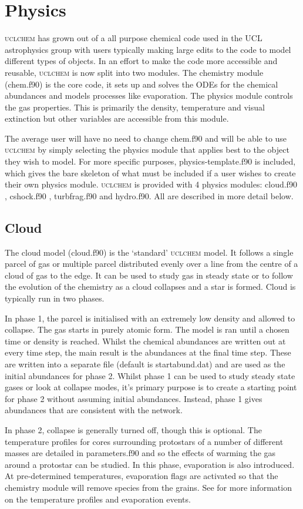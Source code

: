 \documentclass{llncs}
\begin{document}
\section{Physics}
\label{sec:physicsmods}
\textsc{uclchem} has grown out of a all purpose chemical code used in the UCL astrophysics group with users typically making large edits to the code to model different types of objects. In an effort to make the code more accessible and reusable, \textsc{uclchem} is now split into two modules. The chemistry module (chem.f90) is the core code, it sets up and solves the ODEs for the chemical abundances and models processes like evaporation. The physics module controls the gas properties. This is primarily the density, temperature and visual extinction but other variables are accessible from this module. \par
The average user will have no need to change chem.f90 and will be able to use \textsc{uclchem} by simply selecting the physics module that applies best to the object they wish to model. For more specific purposes, physics-template.f90 is included, which gives the bare skeleton of what must be included if a user wishes to create their own physics module. \textsc{uclchem} is provided with 4 physics modules: cloud.f90 \citep{viti2004}, cshock.f90 \citep{jimenez2008}, turbfrag.f90 \citep{Holdship2015} and hydro.f90. All are described in more detail below.
%
\subsection{Cloud}
The cloud model (cloud.f90) is the `standard' \textsc{uclchem} model. It follows a single parcel of gas or multiple parcel distributed evenly over a line from the centre of a cloud of gas to the edge. It can be used to study gas in steady state or to follow the evolution of the chemistry as a cloud collapses and a star is formed. Cloud is typically run in two phases. \par
In phase 1, the parcel is initialised with an extremely low density and allowed to collapse. The gas starts in purely atomic form. The model is ran until a chosen time or density is reached. Whilst the chemical abundances are written out at every time step, the main result is the abundances at the final time step. These are written into a separate file (default is startabund.dat) and are used as the initial abundances for phase 2. Whilst phase 1 can be used to study steady state gases or look at collapse modes, it's primary purpose is to create a starting point for phase 2 without assuming initial abundances. Instead, phase 1 gives abundances that are consistent with the network.\par
In phase 2, collapse is generally turned off, though this is optional. The temperature profiles for cores surrounding protostars of a number of different masses are detailed in parameters.f90 and so the effects of warming the gas around a protostar can be studied. In this phase, evaporation is also introduced. At pre-determined temperatures, evaporation flags are activated so that the chemistry module will remove species from the grains. See \citet{viti2004} for more information on the temperature profiles and evaporation events.
%
\end{document}

